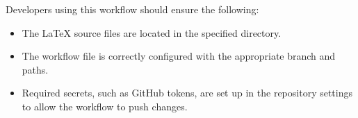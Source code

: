 Developers using this workflow should ensure the following:

\begin{itemize}
\item The LaTeX source files are located in the specified directory.
\item The workflow file is correctly configured with the appropriate branch and paths.
\item Required secrets, such as GitHub tokens, are set up in the repository settings to allow the workflow to push changes.
\end{itemize}

